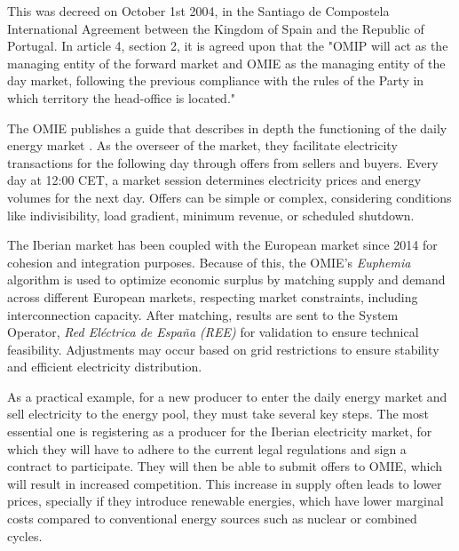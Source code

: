 \documentclass[12pt]{report} %
\begin{document}
This was decreed on October 1st 2004, in the Santiago de Compostela International Agreement between the Kingdom of Spain and the Republic of Portugal. In article 4, section 2, it is agreed upon that the "OMIP will act as the managing entity of the forward market and OMIE as the managing entity of the day market, following the previous compliance with the rules of the Party in which territory the head-office is located." \cite{SantiagoAgreement2004}


The OMIE publishes a guide that describes in depth the functioning of the daily energy market \cite{OMIE_MercadoDiario}. As the overseer of the market, they facilitate electricity transactions for the following day through offers from sellers and buyers. Every day at 12:00 CET, a market session determines electricity prices and energy volumes for the next day. Offers can be simple or complex, considering conditions like indivisibility, load gradient, minimum revenue, or scheduled shutdown.

The Iberian market has been coupled with the European market since 2014 for cohesion and integration purposes. Because of this, the OMIE's \textit{Euphemia} algorithm is used to optimize economic surplus by matching supply and demand across different European markets, respecting market constraints, including interconnection capacity. After matching, results are sent to the System Operator, \textit{Red Eléctrica de España (REE)} for validation to ensure technical feasibility. Adjustments may occur based on grid restrictions to ensure stability and efficient electricity distribution.

As a practical example, for a new producer to enter the daily energy market and sell electricity to the energy pool, they must take several key steps. The most essential one is registering as a producer for the Iberian electricity market, for which they will have to adhere to the current legal regulations and sign a contract to participate. They will then be able to submit offers to OMIE, which will result in increased competition. This increase in supply often leads to lower prices, specially if they introduce renewable energies, which have lower marginal costs compared to conventional energy sources such as nuclear or combined cycles.
\end{document}
